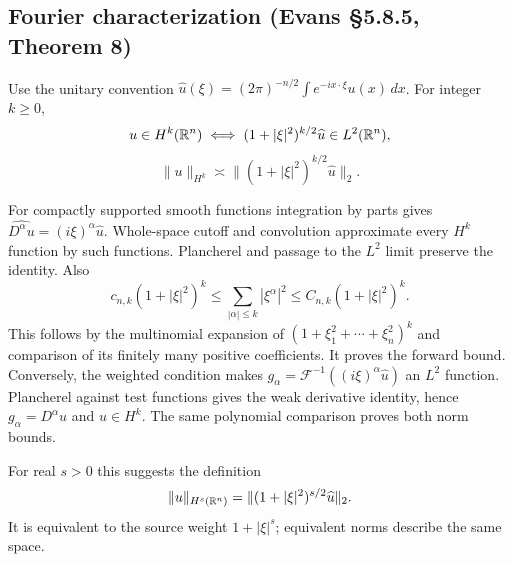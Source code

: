 \subsection{Fourier characterization (Evans \S5.8.5, Theorem 8)}
Use the unitary convention
$\widehat u(\xi)=(2\pi)^{-n/2}\int e^{-ix\cdot\xi}u(x)\,dx$.
For integer $k\geq0$,
\[
 u\in H^k(\mathbb{R}^n)\iff
 (1+|\xi|^2)^{k/2}\widehat u\in L^2(\mathbb{R}^n),
 \]
 \[
 \|u\|_{H^k}\asymp
 \|(1+|\xi|^2)^{k/2}\widehat u\|_2 .
\]
\begin{expandedproof}
For compactly supported smooth functions integration by parts gives
$\widehat{D^\alpha u}=(i\xi)^\alpha\widehat u$.
Whole-space cutoff and convolution approximate every $H^k$ function
by such functions. Plancherel and passage to the $L^2$ limit preserve
the identity. Also
\[
 c_{n,k}(1+|\xi|^2)^k
 \leq\sum_{|\alpha|\leq k}|\xi^\alpha|^2
 \leq C_{n,k}(1+|\xi|^2)^k.
\]
This follows by the multinomial expansion of
$(1+\xi_1^2+\cdots+\xi_n^2)^k$ and comparison of its finitely many
positive coefficients. It proves the forward bound.
Conversely, the weighted condition makes
$g_\alpha=\mathcal F^{-1}((i\xi)^\alpha\widehat u)$ an $L^2$ function.
Plancherel against test functions gives the weak derivative identity,
hence $g_\alpha=D^\alpha u$ and $u\in H^k$. The same polynomial
comparison proves both norm bounds.
\end{expandedproof}
For real $s>0$ this suggests the definition
\[
 \|u\|_{H^s(\mathbb{R}^n)}
 =\|(1+|\xi|^2)^{s/2}\widehat u\|_2.
\]
It is equivalent to the source weight $1+|\xi|^s$; equivalent norms
describe the same space.
\Needspace{45mm}
